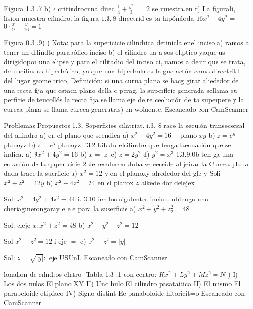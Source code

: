 Figura 1.3 .7
b) $\epsilon$ critindrocuna direc $\frac{1}{4}+\frac{y^2}{3}=12$ se muestra.en
r) La figurali, lision muestra cilindro. la figura $1.3,8$ directrid es ta hipóndoda $16 x^2-4 y^2=$ $0 \cdot \frac{x}{9}-\frac{y}{16}=1$





Figura 0.3 .9)
)
Nota: para la supericicie cilindrica detinicla enel inciso a) ramos a tener un dilindto parabólico inciso b) el cilindro ua a sos eliptico yaque us dirigidopor una elipse y para el cilitadio del inciso ci, uamos a decir que se trata, de uncilindro hiperbólico, ya que una hiperbola es la gue actúa como directrild del lugar geome trico,
Definición: si una curua plana se hacg girar aliededor de una recta fija que estaen plano della e perag, la superfleie generada sellama su perficie de teucollós la recta fija se llama eje de re ceolución de ta superpere y la curcea plana se llama curcea generatris) en woluente.
Escaneado con CamScanner




Problemas Propuestos 1.3, Soperficies cilntriat.
i.3. 8 race la secuión transecersal del allindro
a) en el plano que seendica
a) $x^2+4 y^2=16 \quad$ plano $x y$
b) $z=e^y$ planoyz
b) $z=e^y$ planoyz
li3.2 bibulu elcilindro que tenga laecuación
que se indica.
a) $9 x^2+4 y^2=16$
b) $x=|z|$
c) $z=2 y^2$
d) $y^2=x^3$
1.3.9.0b ten ga una ecuación de la quper cicie
2 de recolucon duba se eeceide al jeirar la Curcea plana dada
trace la suerficie
a) $x^2=12$ y en el planoxy alrededor del gle y Soli $x^2+z^2=12 y$
b) $x^2+4 z^2=24$ en el planox $z$ alkede dor delejex

Sol: $x^2+4 y^2+4 z^2=44$
i. 3.10 ien los sigulentes incisos obtenga una cheriaginerongaray e e e para la suserficie
a) $x^2+y^2+z_2^2=48$

Sol: eleje $x: x^2+z^2=48$
b) $x^2+y^2-z^2=12$

Sol $x^2-z^2=12$ i eje $=$
c) $x^2+z^2=|y|$

Sol: $z=\sqrt{|y|}:$ eje
USUnL
Escaneado con CamScanner




lonalion de cilndros elntro-
Tabla 1.3 .1
con centro: $K x^2+L y^2+M z^2=N$
)
I) Los dos nulos El plano XY
II) Uno hulo El cilindro pasataitica
II) El mismo El parabeloide etipíaco
IV) Signo distint
Ee panaboloide hitoricit=o
Escaneado con CamScanner


